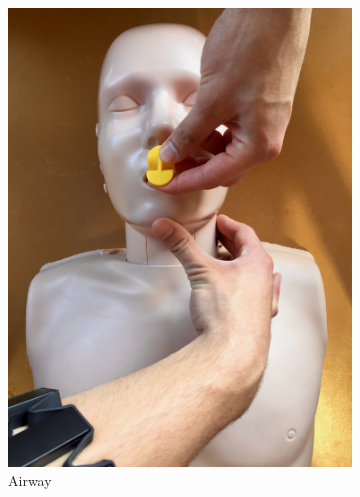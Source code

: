 \begin{figure}[b]
\begin{subfigure}[b]{0.18\textwidth}
		\includegraphics[width=\textwidth]{pictures/oral-airway}
		\caption{Airway}
		\label{fig:oral-airway}
	\end{subfigure}
	~ %
	\begin{subfigure}[b]{0.18\textwidth}

\end{subfigure}
\end{figure}
